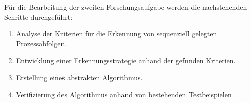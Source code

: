 Für die Bearbeitung der zweiten Forschungsaufgabe werden die nachstehenden Schritte durchgeführt:
\begin{enumerate}
	\item Analyse der Kriterien für die Erkennung von sequenziell gelegten Prozessabfolgen.
	\item Entwicklung einer Erkennungsstrategie anhand der gefunden Kriterien.
	\item Erstellung eines abstrakten Algorithmus.
	\item Verifizierung des Algorithmus anhand von bestehenden Testbeispielen \cite{max}.
\end{enumerate}


